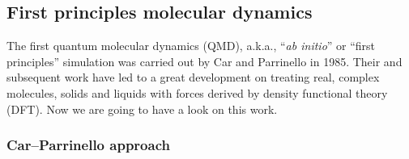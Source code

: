 
\subsection{First principles molecular dynamics}

The first quantum molecular dynamics (QMD),
a.k.a., ``\textit{ab initio}'' or ``first principles'' simulation was
carried out by Car and Parrinello in 1985.\cite{Car:1985ix}
Their and subsequent work
have led to a great development on treating real, complex molecules,
solids and liquids with forces derived by density functional theory
(DFT).\cite{martin2004electronic} Now we are going to have a look
on this work.


\subsubsection{Car--Parrinello approach}

